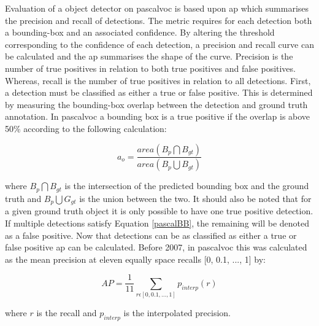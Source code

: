 Evaluation of a object detector on \gls{pascalvoc} is based upon \gls{ap} which summarises the precision and recall of detections. The metric requires for each detection both a bounding-box and an associated confidence. By altering the threshold corresponding to the confidence of each detection, a precision and recall curve can be calculated and the \gls{ap} summarises the shape of the curve. Precision is the number of true positives in relation to both true positives and false positives. Whereas, recall is the number of true positives in relation to all detections. First, a detection must be classified as either a true or false positive. This is determined by measuring the bounding-box overlap between the detection and ground truth annotation. In \gls{pascalvoc} a bounding box is a true positive if the overlap is above 50\% according to the following calculation:

\begin{equation}\label{pascalBB}
	a_o = \frac{area(B_p \bigcap B_{gt})}{area(B_p \bigcup B_{gt})}
\end{equation}
 
where $B_p \bigcap B_{gt}$ is the intersection of the predicted bounding box and the ground truth and $B_p \bigcup G_{gt}$ is the union between the two. It should also be noted that for a given ground truth object it is only possible to have one true positive detection. If multiple detections satisfy Equation \ref{pascalBB}, the remaining will be denoted as a false positive. Now that detections can be as classified as either a true or false positive \gls{ap} can be calculated. Before 2007, in \gls{pascalvoc} this was calculated as the mean precision at eleven equally space recalls [0, 0.1, ..., 1] by:

\begin{equation}
	AP = \frac{1}{11} \sum_{r\epsilon[0, 0.1, ..., 1]}p_{interp}(r)  
\end{equation}

where $r$ is the recall and $p_{interp}$ is the interpolated precision.

